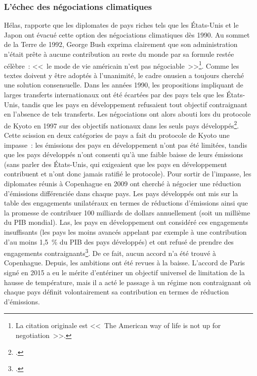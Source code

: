 \documentclass[a5paper,french,openany]{memoir}
\begin{document}
\subsubsection{L'échec des négociations climatiques}
Hélas, \citet{bertram_tradeable_1992} rapporte que les diplomates de pays riches tels que les États-Unis et le Japon ont évacué cette option des négociations climatiques dès 1990. Au sommet de la Terre de 1992, George Bush exprima clairement que son administration n'était prête à aucune contribution au reste du monde par sa formule restée célèbre~: <<~le mode de vie américain n'est pas négociable~>>\footnote{La citation originale est <<~The American way of life is not up for negotiation~>>.}. %
Comme les textes doivent y être adoptés à l'unanimité, le cadre onusien a toujours cherché une solution consensuelle. Dans les années 1990, les propositions impliquant de larges transferts internationaux ont été écartées par des pays tels que les États-Unis, tandis que les pays en développement refusaient tout objectif contraignant en l'absence de tels transferts. Les négociations ont alors abouti lors du protocole de Kyoto en 1997 sur des objectifs nationaux dans les seuls pays développés\footnote{\cite{gupta_history_2010}.}. Cette scission en deux catégories de pays a fait du protocole de Kyoto une impasse~: les émissions des pays en développement n'ont pas été limitées, tandis que les pays développés n'ont consenti qu'à une faible baisse de leurs émissions (sans parler des États-Unis, qui exigeaient que les pays en développement contribuent et n'ont donc jamais ratifié le protocole). Pour sortir de l'impasse, les diplomates réunis à Copenhague en 2009 ont cherché à négocier une réduction d'émissions différenciée dans chaque pays. Les pays développés ont mis sur la table des engagements unilatéraux en termes de réductions d'émissions ainsi que la promesse de contribuer 100 milliards de dollars annuellement (soit un millième du PIB mondial). Las, les pays en développement ont considéré ces engagements insuffisants (les pays les moins avancés appelant par exemple à une contribution d'au moins 1,5~\% du PIB des pays développés) et ont refusé de prendre des engagements contraignants\footnote{\cite{dimitrov_inside_2010}.}. De ce fait, aucun accord n'a été trouvé à Copenhague. Depuis, les ambitions ont été revues à la baisse. L'accord de Paris signé en 2015  a eu le mérite d'entériner un objectif universel de limitation de la hausse de température, mais il a acté le passage à un régime non contraignant où chaque pays définit volontairement sa contribution en termes de réduction d'émissions. 
\end{document}

